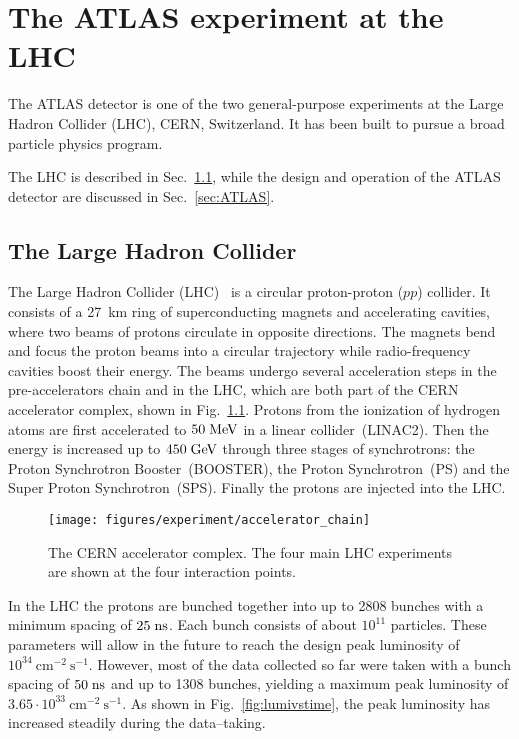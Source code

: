\chapter{The ATLAS experiment at the LHC}
\label{sec:experiment}

The ATLAS detector is one of the two general-purpose experiments at
the Large Hadron Collider (LHC), CERN, Switzerland.
It has been built to pursue a broad particle physics program. 

The LHC is described in Sec.~\ref{sec:LHC}, while the design and
operation of the ATLAS detector are discussed in
Sec.~\ref{sec:ATLAS}.

\section{The Large Hadron Collider}
\label{sec:LHC}

The Large Hadron Collider (LHC)~\cite{LHCreport} is a circular
proton-proton ($pp$) collider. 
It consists of a 27~km ring of superconducting magnets and
accelerating cavities, where two beams of protons circulate in
opposite directions. 
The magnets bend and focus the proton beams into a circular trajectory
while radio-frequency cavities boost their energy.
The beams undergo several acceleration steps in the pre-accelerators
chain and in the LHC, which are both part of the CERN accelerator
complex, shown in Fig.~\ref{fig:lhc}.
Protons from the ionization of hydrogen atoms are first accelerated to
\mbox{$50 \; \mathrm{MeV}$} in a linear collider~(LINAC2). Then the energy is
increased up to \mbox{$450 \; \mathrm{GeV}$} through three stages of
synchrotrons: the Proton Synchrotron Booster~(BOOSTER), the Proton
Synchrotron~(PS) and the Super Proton Synchrotron~(SPS).
Finally the protons are injected into the LHC.

\begin{figure}[ht]
\begin{center}
\texttt{[image: figures/experiment/accelerator\_chain]}
\caption[CERN Accelerator complex]{
  The CERN accelerator complex. The four main LHC experiments are
  shown at the four interaction points.}
\label{fig:lhc}
\end{center}
\end{figure}

In the LHC the protons are bunched together into up to 2808 bunches 
with a minimum spacing of \mbox{$25 \; \mathrm{ns}$}. 
Each bunch consists of about $10^{11}$ particles. 
These parameters will allow in the future to reach 
the design peak luminosity of \mbox{$10^{34}~\mathrm{cm^{-2}~s^{-1}}$}.
However, most of the data collected so far were taken with a bunch 
spacing of \mbox{$50 \; \mathrm{ns}$} and up to 1308 bunches, yielding a maximum
peak luminosity of \mbox{$3.65\cdot{}10^{33}~\mathrm{cm^{-2}~s^{-1}}$}.
As shown in Fig.~\ref{fig:lumivstime}, the peak luminosity has increased
steadily during the data--taking.

